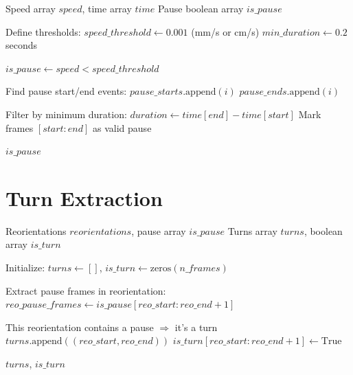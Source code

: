 \documentclass[
  11pt,
]{article}
\begin{document}
\begin{algorithm}[H]
\caption{Detect Pauses}
\label{alg:detect-pauses}
\begin{algorithmic}[1]
\REQUIRE Speed array $speed$, time array $time$
\ENSURE Pause boolean array $is\_pause$

\STATE Define thresholds:
\STATE \quad $speed\_threshold \leftarrow 0.001$ (mm/s or cm/s)
\STATE \quad $min\_duration \leftarrow 0.2$ seconds

\STATE $is\_pause \leftarrow speed < speed\_threshold$

\STATE Find pause start/end events:
        \STATE $pause\_starts.\text{append}(i)$
        \STATE $pause\_ends.\text{append}(i)$
    \ENDIF
\ENDFOR

\STATE Filter by minimum duration:
    \STATE $duration \leftarrow time[end] - time[start]$
        \STATE Mark frames $[start:end]$ as valid pause
    \ENDIF
\ENDFOR

\RETURN $is\_pause$
\end{algorithmic}
\end{algorithm}

\hypertarget{turn-extraction}{%
\section{Turn Extraction}\label{turn-extraction}}

\begin{algorithm}[H]
\caption{Extract Turns from Reorientations}
\label{alg:extract-turns}
\begin{algorithmic}[1]
\REQUIRE Reorientations $reorientations$, pause array $is\_pause$
\ENSURE Turns array $turns$, boolean array $is\_turn$

\STATE Initialize: $turns \leftarrow []$, $is\_turn \leftarrow \text{zeros}(n\_frames)$

    \STATE Extract pause frames in reorientation:
    \STATE \quad $reo\_pause\_frames \leftarrow is\_pause[reo\_start:reo\_end+1]$
    
        \STATE This reorientation contains a pause $\Rightarrow$ it's a turn
        \STATE $turns.\text{append}((reo\_start, reo\_end))$
        \STATE $is\_turn[reo\_start:reo\_end+1] \leftarrow \text{True}$
    \ENDIF
\ENDFOR

\RETURN $turns$, $is\_turn$
\end{algorithmic}
\end{algorithm}
\end{document}
